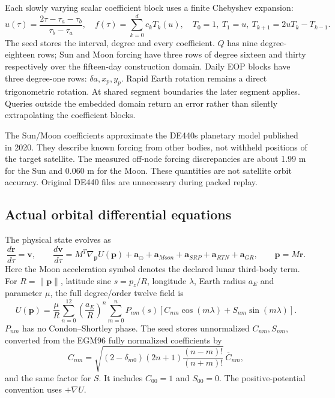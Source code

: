 Each slowly varying scalar coefficient block uses a finite Chebyshev expansion:
\begin{equation}
u(\tau)=\frac{2\tau-\tau_a-\tau_b}{\tau_b-\tau_a},\quad
f(\tau)=\sum_{k=0}^{d}c_k T_k(u),\quad
T_0=1,\ T_1=u,\ T_{k+1}=2uT_k-T_{k-1}.
\end{equation}
The seed stores the interval, degree and every coefficient. $Q$ has nine
degree-eighteen rows; Sun and Moon forcing have three rows of degree sixteen and
thirty respectively over the fifteen-day construction domain. Daily EOP blocks
have three degree-one rows: $\delta a,x_p,y_p$.
Rapid Earth rotation remains a direct trigonometric
rotation. At shared segment boundaries the later segment applies. Queries
outside the embedded domain return an error rather than silently extrapolating
the coefficient blocks.

The Sun/Moon coefficients approximate the DE440s planetary model published in
2020. They describe known forcing from other bodies, not withheld positions of
the target satellite. The measured off-node forcing discrepancies are about
1.99 m for the Sun and 0.060 m for the Moon. These quantities are not satellite
orbit accuracy. Original DE440 files are unnecessary during packed replay.

\subsection{Actual orbital differential equations}
The physical state evolves as
\begin{equation}
\frac{d\mathbf r}{d\tau}=\mathbf v,\qquad
\frac{d\mathbf v}{d\tau}=M^T\nabla_{\mathbf p}U(\mathbf p)
+\mathbf a_\odot+\mathbf a_{Moon}+\mathbf a_{SRP}+\mathbf a_{RTN}+\mathbf a_{GR},
\qquad \mathbf p=M\mathbf r.
\end{equation}
Here the Moon acceleration symbol denotes the declared lunar third-body term.
For $R=\|\mathbf p\|$, latitude sine $s=p_z/R$, longitude $\lambda$,
Earth radius $a_E$ and parameter $\mu$, the full degree/order twelve field is
\begin{equation}
U(\mathbf p)=\frac{\mu}{R}\sum_{n=0}^{12}\left(\frac{a_E}{R}\right)^n
\sum_{m=0}^{n}P_{nm}(s)[C_{nm}\cos(m\lambda)+S_{nm}\sin(m\lambda)].
\end{equation}
$P_{nm}$ has no Condon--Shortley phase. The seed stores unnormalized
$C_{nm},S_{nm}$, converted from the EGM96 fully normalized coefficients by
\begin{equation}
C_{nm}=\sqrt{(2-\delta_{m0})(2n+1)\frac{(n-m)!}{(n+m)!}}\,\overline C_{nm},
\end{equation}
and the same factor for $S$. It includes $C_{00}=1$ and $S_{00}=0$.
The positive-potential convention uses $+\nabla U$.

